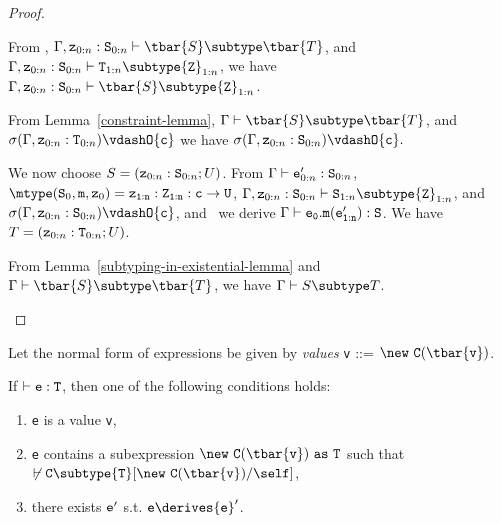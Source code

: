 \begin{proof}
\begin{itemize}
\begin{itemize}
{            From ,
            $\Gamma, {\tt z}_{0:n}: {\tt S}_{0:n} \vdash 
                  \tbar{S} \subtype \tbar{T}$,
            and
            $\Gamma, {\tt z}_{0:n}: {\tt S}_{0:n} \vdash 
                    {\tt T}_{1:n} \subtype {\tt Z}_{1:n}$, 
            we have
            $\Gamma, {\tt z}_{0:n}: {\tt S}_{0:n} \vdash 
                  \tbar{S} \subtype {\tt Z}_{1:n}$.

            From Lemma~\ref{constraint-lemma}, 
            $\Gamma \vdash \tbar{S} \subtype \tbar{T}$, and
            $\sigma(\Gamma, {\tt z}_{0:n}: {\tt T}_{0:n}) \vdashO
                              {\tt c}$
            we have
            $\sigma(\Gamma, {\tt z}_{0:n}: {\tt S}_{0:n}) \vdashO
                              {\tt c}.$

            We now choose 
               $S=({\tt z}_{0:n}: {\tt S}_{0:n}; U)$.
            From 
            $\Gamma \vdash {\tt e}_{0:n}': {\tt S}_{0:n}$,
            $\mtype({\tt S}_0,{\tt m},{\tt z}_0) =
               \tt {\tt z}_{1:n}: {\tt Z}_{1:n}:c \rightarrow {\tt U}$,
            $\Gamma, {\tt z}_{0:n}: {\tt S}_{0:n} \vdash
                  {\tt S}_{1:n} \subtype {\tt Z}_{1:n}$, and
            $\sigma(\Gamma, {\tt z}_{0:n}: {\tt S}_{0:n}) \vdashO
                  {\tt c}$,
            and \TInvk\ we derive
            $\Gamma \vdash {\tt e_0.m(e_{1:n}')}: {\tt S}$.
            We have 
               $T=({\tt z}_{0:n}: {\tt T}_{0:n}; U)$.

            From Lemma~\ref{subtyping-in-existential-lemma} and
            $\Gamma \vdash \tbar{S} \subtype \tbar{T}$, we have
            $\Gamma \vdash S \subtype T$.
   }
   \end{itemize}
\end{itemize}
\end{proof}

\noindent
Let the normal form of expressions be given by {\em values}
{\tt v} {::=} $\new\ {\tt C(\tbar{v})}$.

\begin{theorem}[Progress] 
\label{progress}
If $\vdash {\tt e: T}$, then one of the following conditions holds:
\begin{enumerate}
\item {\tt e} is a value {\tt v}, 
\item {\tt e} contains a subexpression ${\tt \new\ C(\tbar{v})~as~T}$ such that
$\not\vdash {\tt C} \subtype {\tt T}[{\tt \new\ C(\tbar{v})}/\self]$,
\item there exists ${\tt e}'$ s.t. ${\tt e} \derives {\tt e}'$.
\end{enumerate}
\end{theorem}

